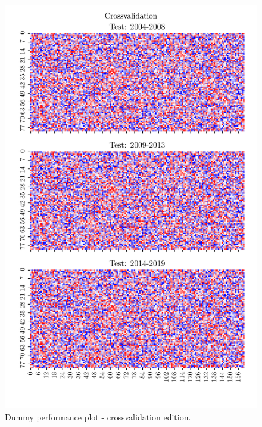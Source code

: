 \begin{figure}[ht]
    \centering
    \includegraphics{python_figs/dummy_model_performace_cross_validation_plot.pdf}
    \caption{Dummy performance plot - crossvalidation edition.}
    \label{fig:dummy_performace_plot_crossvalidation}
\end{figure}


\cleardoublepage

